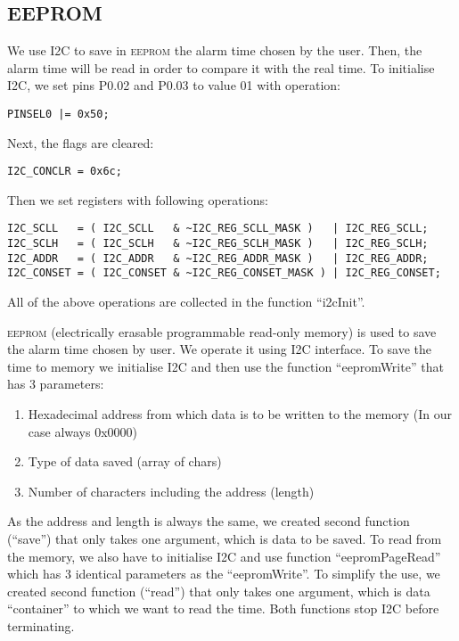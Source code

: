 \documentclass[10pt]{article}
\begin{document}
\clearpage
\subsection{EEPROM}

We use I2C to save in \textsc{eeprom} the alarm time chosen by the user. Then, the alarm time will be read in order to compare it with the real time.
To initialise I2C, we set pins {\small P0.02} and {\small P0.03} to value 01 with operation:
\begin{lstlisting}  
PINSEL0 |= 0x50; 
\end{lstlisting}    
Next, the flags are cleared: 
\begin{lstlisting}
I2C_CONCLR = 0x6c; 
\end{lstlisting} 
Then we set registers with following operations:
\begin{lstlisting}
I2C_SCLL   = ( I2C_SCLL   & ~I2C_REG_SCLL_MASK )   | I2C_REG_SCLL; 
I2C_SCLH   = ( I2C_SCLH   & ~I2C_REG_SCLH_MASK )   | I2C_REG_SCLH; 
I2C_ADDR   = ( I2C_ADDR   & ~I2C_REG_ADDR_MASK )   | I2C_REG_ADDR; 
I2C_CONSET = ( I2C_CONSET & ~I2C_REG_CONSET_MASK ) | I2C_REG_CONSET;
\end{lstlisting}
All of the above operations are collected in the function “i2cInit”.

\textsc{eeprom} (electrically erasable programmable read-only memory) is used to save the alarm time chosen by user. We operate it using I2C interface. 
To save the time to memory we initialise I2C and then use the function ``eepromWrite'' that has 3 parameters:
\begin{enumerate}
    \item Hexadecimal address from which data is to be written to the memory (In our case always 0x0000)
    \item Type of data saved (array of chars)
    \item Number of characters including the address (length)
\end{enumerate}

As the address and length is always the same, we created second function (``save'') that only takes one argument, which is data to be saved.
To read from the memory, we also have to initialise I2C and use function ``eepromPageRead''
which has 3 identical parameters as the ``eepromWrite''. 
To simplify the use, we created second function (``read'') 
that only takes one argument, which is data ``container'' to which we want to read the time.
Both functions stop I2C before terminating.
\end{document}
